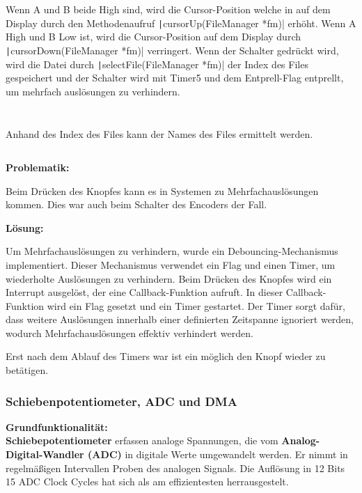 Wenn A und B beide High sind, wird die Cursor-Position welche in auf dem Display durch den Methodenaufruf \texttt|cursorUp(FileManager *fm)|
erhöht. Wenn A High und B Low ist, wird die Cursor-Position auf dem Display durch \texttt|cursorDown(FileManager *fm)| verringert. Wenn der Schalter gedrückt wird, wird die Datei durch \texttt|selectFile(FileManager *fm)| der Index des Files gespeichert und der Schalter wird mit Timer5 und dem Entprell-Flag entprellt, um mehrfach auslösungen zu verhindern.
 
 \inputminted[firstline=68, lastline=74]{c}{../../f401_display_encoder_fader_test/Core/Src/filemanager.c}
 
  \inputminted[firstline=84, lastline=90]{c}{../../f401_display_encoder_fader_test/Core/Src/filemanager.c}
  
\newpage  
Anhand des Index des Files kann der Names des Files ermittelt werden.

	
\inputminted[firstline=159, lastline=161]{c}{../../f401_display_encoder_fader_test/Core/Src/filemanager.c}

\textbf{Problematik:}

Beim Drücken des Knopfes kann es in Systemen zu Mehrfachauslösungen kommen. Dies war auch beim Schalter des Encoders der Fall.

\textbf{Lösung:}

Um Mehrfachauslösungen zu verhindern, wurde ein Debouncing-Mechanismus implementiert. Dieser Mechanismus verwendet ein Flag und einen Timer, um wiederholte Auslösungen zu verhindern. Beim Drücken des Knopfes wird ein Interrupt ausgelöst, der eine Callback-Funktion aufruft. In dieser Callback-Funktion wird ein Flag gesetzt und ein Timer gestartet. Der Timer sorgt dafür, dass weitere Auslösungen innerhalb einer definierten Zeitspanne ignoriert werden, wodurch Mehrfachauslösungen effektiv verhindert werden.

Erst nach dem Ablauf des Timers war ist ein möglich den Knopf wieder zu betätigen.

\subsubsection{Schiebenpotentiometer, ADC und DMA}

\textbf{Grundfunktionalität:}\\

\textbf{Schiebepotentiometer} erfassen analoge Spannungen, die vom \textbf{Analog-Digital-Wandler (ADC)} in digitale Werte umgewandelt werden. Er nimmt in regelmäßigen Intervallen Proben des analogen Signals. Die Auflösung in 12 Bits 15 ADC Clock Cycles hat sich als am effizientesten herrausgestelt.

